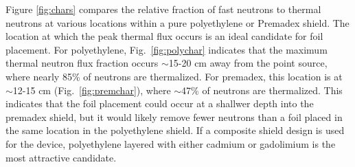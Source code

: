\documentclass{mc2015}
\begin{document}
Figure \ref{fig:chars} compares the relative fraction of fast neutrons to thermal neutrons at various locations within a pure polyethylene or Premadex shield. The location at which the peak thermal flux occurs is an ideal candidate for foil placement. For polyethylene, Fig.\ \ref{fig:polychar} indicates that the maximum thermal neutron flux fraction occurs $\sim$15-20 cm away from the point source, where nearly 85\% of neutrons are thermalized. For premadex, this location is at $\sim$12-15 cm (Fig.\ \ref{fig:premchar}), where $\sim$47\% of neutrons are thermalized. This indicates that the foil placement could occur at a shallwer depth into the premadex shield, but it would likely remove fewer neutrons than a foil placed in the same location in the polyethylene shield. If a composite shield design is used for the device, polyethylene layered with either cadmium or gadolimium is the most attractive candidate. 
\end{document}
